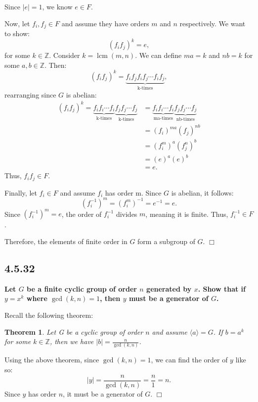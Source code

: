 \documentclass[11pt, a4paper]{article}
\DeclareMathOperator{\lcm}{lcm}
\newtheorem{theorem}{Theorem}
\begin{document}
Since $|e| = 1$, we know $e \in F$.

Now, let $f_{i}, f_{j} \in F$ and assume they have orders $m$ and $n$ respectively. We want to show:
\[
  (f_{i} f_{j})^{k} = e,
\]
for some $k \in \mathbb{Z}$. Consider $k = \lcm(m, n)$. We can define $ma = k$ and $nb = k$ for some $a, b \in \mathbb{Z}$. Then:
\[
  (f_{i} f_{j})^k = \underbrace{f_{i} f_{j} f_{i} f_{j} \cdots f_{i} f_{j}}_{\text{k-times}},
\]
rearranging since $G$ is abelian:
\begin{align*}
  (f_{i} f_{j})^k = \underbrace{f_{i} f_{i} \cdots f_{i}}_{\text{k-times}} \underbrace{f_{j} f_{j} \cdots f_{j}}_{\text{k-times}} &= \underbrace{f_{i} f_{i} \cdots f_{i}}_{\text{ma-times}} \underbrace{f_{j} f_{j} \cdots f_{j}}_{\text{nb-times}} \\
                                        &= (f_{i})^{ma} (f_{j})^{nb} \\
                                        &= (f_{i}^m)^{a} (f_{j}^n)^{b} \\
                                        &= (e)^{a} (e)^{b} \\
                                        &= e.
\end{align*}
Thus, $f_{i} f_{j} \in F$.

\newpage

Finally, let $f_{i} \in F$ and assume $f_{i}$ has order m. Since $G$ is abelian, it follows:
\[
  (f_{i}^{-1})^m = (f_{i}^{m})^{-1} = e^{-1} = e.
\]
Since $(f_{i}^{-1})^m = e$, the order of $f_{i}^{-1}$ divides $m$, meaning it is finite. Thus, $f_{i}^{-1} \in F$.

Therefore, the elements of finite order in $G$ form a subgroup of $G$. $\Box$

\subsection{4.5.32}
\textbf{Let $G$ be a finite cyclic group of order $n$ generated by $x$. Show that if $y = x^k$ where $\gcd(k, n) = 1$, then $y$ must be a generator of $G$.}

Recall the following theorem:
\begin{theorem}
  Let G be a cyclic group of order $n$ and assume $\langle a \rangle = G$. If $b = a^k$ for some $k \in \mathbb{Z}$, then we have $|b| = \frac{n}{\gcd(k, n)}$.
\end{theorem}

Using the above theorem, since $\gcd(k, n) = 1$, we can find the order of $y$ like so:
\[
  |y| = \frac{n}{\gcd(k, n)} = \frac{n}{1} = n.
\]
Since $y$ has order $n$, it must be a generator of $G$. $\Box$
\end{document}
